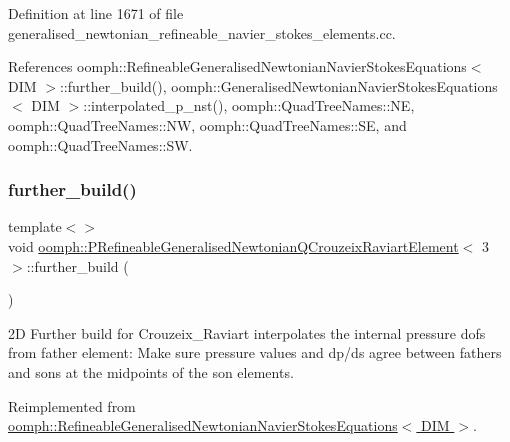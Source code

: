 Definition at line 1671 of file generalised\+\_\+newtonian\+\_\+refineable\+\_\+navier\+\_\+stokes\+\_\+elements.\+cc.



References oomph\+::\+Refineable\+Generalised\+Newtonian\+Navier\+Stokes\+Equations$<$ D\+I\+M $>$\+::further\+\_\+build(), oomph\+::\+Generalised\+Newtonian\+Navier\+Stokes\+Equations$<$ D\+I\+M $>$\+::interpolated\+\_\+p\+\_\+nst(), oomph\+::\+Quad\+Tree\+Names\+::\+NE, oomph\+::\+Quad\+Tree\+Names\+::\+NW, oomph\+::\+Quad\+Tree\+Names\+::\+SE, and oomph\+::\+Quad\+Tree\+Names\+::\+SW.

\mbox{\label{classoomph_1_1PRefineableGeneralisedNewtonianQCrouzeixRaviartElement_a5c0f444f1be1636d9cb67c754bbf76ac}} 
\subsubsection{\texorpdfstring{further\+\_\+build()}{further\_build()}\hspace{0.1cm}{\footnotesize\ttfamily [3/3]}}
{\footnotesize\ttfamily template$<$$>$ \\
void \hyperlink{classoomph_1_1PRefineableGeneralisedNewtonianQCrouzeixRaviartElement}{oomph\+::\+P\+Refineable\+Generalised\+Newtonian\+Q\+Crouzeix\+Raviart\+Element}$<$ 3 $>$\+::further\+\_\+build (\begin{DoxyParamCaption}{ }\end{DoxyParamCaption})\hspace{0.3cm}{\ttfamily [virtual]}}

2D Further build for Crouzeix\+\_\+\+Raviart interpolates the internal pressure dofs from father element\+: Make sure pressure values and dp/ds agree between fathers and sons at the midpoints of the son elements. 

Reimplemented from \hyperlink{classoomph_1_1RefineableGeneralisedNewtonianNavierStokesEquations_a53a4c5277d517f5df48df7c1953b2b02}{oomph\+::\+Refineable\+Generalised\+Newtonian\+Navier\+Stokes\+Equations$<$ D\+I\+M $>$}.



